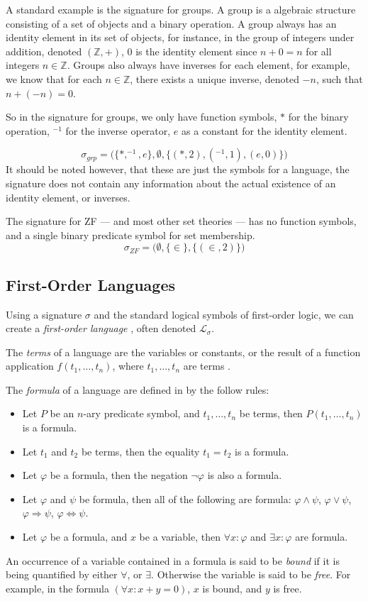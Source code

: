 \documentclass[11pt]{report}
\theoremstyle{definition}
\theoremstyle{theorem}
\theoremstyle{lemma}
\begin{document}
A standard example is the signature for groups.
A group is a algebraic structure consisting of a set of objects and a binary operation.
A group always has an identity element in its set of objects, for instance, in the group of integers under addition, denoted $(\mathbb{Z}, +)$, $0$ is the identity element since $n + 0 = n$ for all integers $n\in\mathbb{Z}$.
Groups also always have inverses for each element, for example, we know that for each $n\in\mathbb{Z}$, there exists a unique inverse, denoted $-n$, such that $n + (-n) = 0$.

So in the signature for groups, we only have function symbols, $*$ for the binary operation, $^{-1}$ for the inverse operator, $e$ as a constant for the identity element.

$$\sigma_{\mathit{grp}} = \big(\{*,^{-1}, e\},\emptyset,\{(*, 2), (^{-1}, 1),(e,0)\}\big)$$
It should be noted however, that these are just the symbols for a language, the signature does not contain any information about the actual existence of an identity element, or inverses.

The signature for ZF --- and most other set theories --- has no function symbols, and a single binary predicate symbol for set membership.
$$\sigma_{\mathit{ZF}} = \big(\emptyset,\{\in\},\{(\in, 2)\})$$

\subsection{First-Order Languages}
Using a signature $\sigma$ and the standard logical symbols of first-order logic, we can create a \emph{first-order language} \cite[ch.~1]{stanmodel}, often denoted $\mathcal{L}_\sigma$.

The \emph{terms} of a language are the variables or constants, or the result of a function application $f(t_1,\ldots, t_n)$, where $t_1,\ldots,t_n$ are terms \cite[ch.~1.3]{selinger}.

The \emph{formula} of a language are defined in \cite[ch~1.4]{selinger}by the follow rules:
\begin{itemize}
  \item Let $P$ be an $n$-ary predicate symbol, and $t_1,\ldots,t_n$ be terms, then $P(t_1,\ldots,t_n)$ is a formula.
  \item Let $t_1$ and $t_2$ be terms, then the equality $t_1 = t_2$ is a formula.
  \item Let $\varphi$ be a formula, then the negation $\neg\varphi$ is also a formula.
  \item Let $\varphi$ and $\psi$ be formula, then all of the following are formula: $\varphi\wedge\psi$, $\varphi\vee\psi$, $\varphi\Rightarrow\psi$, $\varphi\Leftrightarrow\psi$.
  \item Let $\varphi$ be a formula, and $x$ be a variable, then $\forall x:\varphi$ and $\exists x:\varphi$ are formula.
\end{itemize}
An occurrence of a variable contained in a formula is said to be \emph{bound} if it is being quantified by either $\forall$, or $\exists$.
Otherwise the variable is said to be \emph{free}. For example, in the formula $(\forall x: x+y=0)$, $x$ is bound, and $y$ is free.
\end{document}
